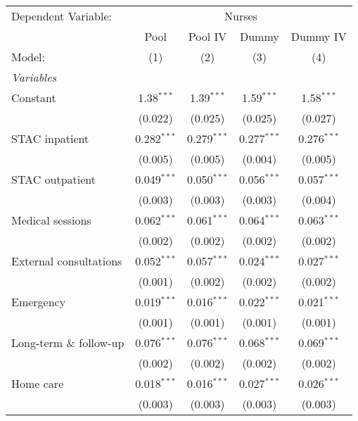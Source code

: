 
\begingroup
\centering
\begin{tabular}{lcccc}
   \tabularnewline \midrule \midrule
   Dependent Variable: & \multicolumn{4}{c}{Nurses}\\
                           & Pool          & Pool IV       & Dummy          & Dummy IV \\   
   Model:                  & (1)           & (2)           & (3)            & (4)\\  
   \midrule
   \emph{Variables}\\
   Constant                & 1.38$^{***}$  & 1.39$^{***}$  & 1.59$^{***}$   & 1.58$^{***}$\\   
                           & (0.022)       & (0.025)       & (0.025)        & (0.027)\\   
   STAC inpatient          & 0.282$^{***}$ & 0.279$^{***}$ & 0.277$^{***}$  & 0.276$^{***}$\\   
                           & (0.005)       & (0.005)       & (0.004)        & (0.005)\\   
   STAC outpatient         & 0.049$^{***}$ & 0.050$^{***}$ & 0.056$^{***}$  & 0.057$^{***}$\\   
                           & (0.003)       & (0.003)       & (0.003)        & (0.004)\\   
   Medical sessions        & 0.062$^{***}$ & 0.061$^{***}$ & 0.064$^{***}$  & 0.063$^{***}$\\   
                           & (0.002)       & (0.002)       & (0.002)        & (0.002)\\   
   External consultations  & 0.052$^{***}$ & 0.057$^{***}$ & 0.024$^{***}$  & 0.027$^{***}$\\   
                           & (0.001)       & (0.002)       & (0.002)        & (0.002)\\   
   Emergency               & 0.019$^{***}$ & 0.016$^{***}$ & 0.022$^{***}$  & 0.021$^{***}$\\   
                           & (0.001)       & (0.001)       & (0.001)        & (0.001)\\   
   Long-term \& follow-up  & 0.076$^{***}$ & 0.076$^{***}$ & 0.068$^{***}$  & 0.069$^{***}$\\   
                           & (0.002)       & (0.002)       & (0.002)        & (0.002)\\   
   Home care               & 0.018$^{***}$ & 0.016$^{***}$ & 0.027$^{***}$  & 0.026$^{***}$\\   
                           & (0.003)       & (0.003)       & (0.003)        & (0.003)\\   

\end{tabular}
